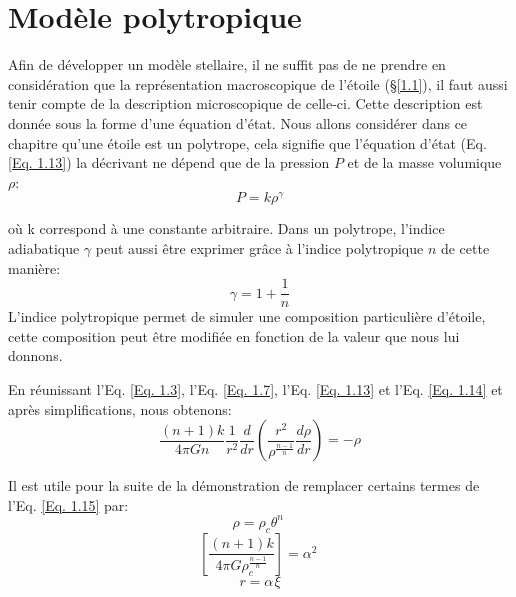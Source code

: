 \section{Modèle polytropique}\label{1.2}

Afin de développer un modèle stellaire, il ne suffit pas de ne prendre en considération que la représentation macroscopique de l'étoile (§\ref{1.1}), il faut aussi tenir compte de la description microscopique de celle-ci. Cette description est donnée sous la forme d'une équation d'état. Nous allons considérer dans ce chapitre qu'une étoile est un polytrope, cela signifie que l'équation d'état (Eq. \ref{Eq. 1.13}) la décrivant ne dépend que de la pression $P$ et de la masse volumique $\rho$:\begin{equation}P=k\rho^{\gamma}\label{Eq. 1.13}\end{equation}

où k correspond à une constante arbitraire. Dans un polytrope, l'indice adiabatique $\gamma$ peut aussi être exprimer grâce à l'indice polytropique $n$ de cette manière:\begin{equation}\gamma=1+\dfrac{1}{n}\label{Eq. 1.14}\end{equation} L'indice polytropique permet de simuler une composition particulière d'étoile, cette composition peut être modifiée en fonction de la valeur que nous lui donnons. \bigskip

En réunissant l'Eq. \ref{Eq. 1.3}, l'Eq. \ref{Eq. 1.7}, l'Eq. \ref{Eq. 1.13} et l'Eq. \ref{Eq. 1.14} et après simplifications, nous obtenons\footnotemark[5]:\begin{equation}\dfrac{(n+1)k}{4\pi Gn}\dfrac{1}{r^{2}}\dfrac{d}{dr}\left( \dfrac{r^{2}}{\rho^{\frac{n-1}{n}}}\dfrac{d\rho}{dr}\right) =-\rho\label{Eq. 1.15}\end{equation}

\vfill
{}

\newpage

Il est utile pour la suite de la démonstration de remplacer certains termes de l'Eq. \ref{Eq. 1.15} par:
\begin{equation}\rho=\rho_{c} \theta^{n}\hspace{3pt}\label{Eq. 1.16}\end{equation}
\begin{equation}\left[\dfrac{(n+1)k}{4\pi G\rho^{\frac{n-1}{n}}_{c}}\right]=\alpha^{2}\hspace{3pt}\label{Eq. 1.17}\end{equation} 
\begin{equation}r=\alpha\hspace{1pt}\xi\label{Eq. 1.18}\end{equation}

